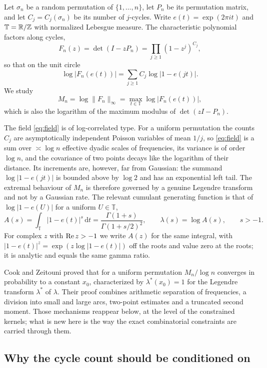 \documentclass[11pt]{article}
\theoremstyle{definition}\newtheorem{definition}[theorem]{Definition}
\theoremstyle{remark}\newtheorem{remark}[theorem]{Remark}
\newcommand{\T}{\mathbb T}\newcommand{\R}{\mathbb R}\newcommand{\C}{\mathbb C}
\newcommand{\dd}{\,\mathrm d}\newcommand{\ind}{\mathbf1}
\numberwithin{equation}{section}\allowdisplaybreaks
\begin{document}
Let $\sigma_n$ be a random permutation of $\{1,\dots,n\}$, let $P_n$ be
its permutation matrix, and let $C_j=C_j(\sigma_n)$ be its number of
$j$-cycles. Write $e(t)=\exp(2\pi it)$ and $\T=\R/\Z$ with normalized
Lebesgue measure. The characteristic polynomial factors along cycles,
\[
 F_n(z)=\det(I-zP_n)=\prod_{j\ge1}(1-z^j)^{C_j},
\]
so that on the unit circle
\begin{equation}\label{eq:field}
 \log|F_n(e(t))|=\sum_{j\ge1}C_j\log|1-e(jt)| .
\end{equation}
We study
\[
 M_n=\log\|F_n\|_\infty=\max_{t\in\T}\log|F_n(e(t))|,
\]
which is also the logarithm of the maximum modulus of $\det(zI-P_n)$.

The field \eqref{eq:field} is of log-correlated type. For a uniform
permutation the counts $C_j$ are asymptotically independent Poisson
variables of mean $1/j$, so \eqref{eq:field} is a sum over $\asymp\log n$
effective dyadic scales of frequencies, its variance is of order
$\log n$, and the covariance of two points decays like the logarithm of
their distance. Its increments are, however, far from Gaussian: the
summand $\log|1-e(jt)|$ is bounded above by $\log 2$ and has an
exponential left tail. The extremal behaviour of $M_n$ is therefore
governed by a genuine Legendre transform and not by a Gaussian rate. The
relevant cumulant generating function is that of $\log|1-e(U)|$ for a
uniform $U\in\T$,
\begin{equation}\label{eq:A}
 A(s)=\int_\T|1-e(t)|^s\dd t=\frac{\Gamma(1+s)}{\Gamma(1+s/2)^2},
 \qquad\lambda(s)=\log A(s),\qquad s>-1.
\end{equation}
For complex $z$ with $\operatorname{Re} z>-1$ we write $A(z)$ for the same integral,
with $|1-e(t)|^z=\exp(z\log|1-e(t)|)$ off the roots and value zero at the
roots; it is analytic and equals the same gamma ratio.

Cook and Zeitouni \cite[Theorem~1.2]{CZ} proved that for a uniform
permutation $M_n/\log n$ converges in probability to a constant $x_0$,
characterized by $\lambda^*(x_0)=1$ for the Legendre transform
$\lambda^*$ of $\lambda$. Their proof combines arithmetic separation of
frequencies, a division into small and large arcs, two-point estimates
and a truncated second moment. Those mechanisms reappear below, at the
level of the constrained kernels; what is new here is the way the exact
combinatorial constraints are carried through them.

\subsection{Why the cycle count should be conditioned on}
\label{subsec:why}
\end{document}
